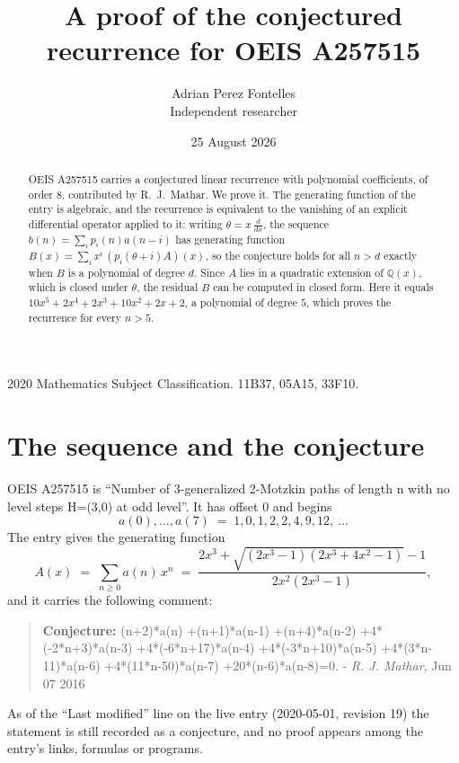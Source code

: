 \documentclass[11pt,a4paper]{article}
\title{A proof of the conjectured recurrence for OEIS A257515}
\author{Adrian Perez Fontelles\\ \small Independent researcher}
\date{25 August 2026}
\theoremstyle{plain}
\theoremstyle{definition}
\begin{document}
\maketitle

\begin{abstract}
OEIS A257515 carries a conjectured linear recurrence with polynomial coefficients, of
order 8, contributed by R.~J.~Mathar. We prove it. The generating function of the
entry is algebraic, and the recurrence is equivalent to the vanishing of an explicit
differential operator applied to it: writing $\theta=x\,\frac{d}{dx}$, the sequence
$b(n)=\sum_{i}p_{i}(n)a(n-i)$ has generating function
$B(x)=\sum_{i}x^{i}\,(p_{i}(\theta+i)A)(x)$, so the conjecture holds for all $n>d$ exactly
when $B$ is a polynomial of degree $d$. Since $A$ lies in a quadratic extension of
$\mathbb{Q}(x)$, which is closed under $\theta$, the residual $B$ can be computed in
closed form. Here it equals $10 x^{5} + 2 x^{4} + 2 x^{3} + 10 x^{2} + 2 x + 2$, a polynomial of degree $5$, which proves
the recurrence for every $n>5$.
\end{abstract}

\noindent\small 2020 Mathematics Subject Classification. 11B37, 05A15, 33F10.\normalsize

\section{The sequence and the conjecture}

OEIS A257515 is ``Number of 3-generalized 2-Motzkin paths of length n with no level steps H=(3,0) at odd level''. It has offset $0$ and begins
\[
a(0),\dots,a(7)\;=\;1, 0, 1, 2, 2, 4, 9, 12,\ \dots
\]
The entry gives the generating function
\begin{equation}\label{eq:gf}
A(x)\;=\;\sum_{n\ge 0} a(n)\,x^{n}\;=\;\frac{2 x^{3} + \sqrt{\left(2 x^{3} - 1\right) \left(2 x^{3} + 4 x^{2} - 1\right)} - 1}{2 x^{2} \left(2 x^{3} - 1\right)} ,
\end{equation}
and it carries the following comment:
\begin{quote}\small
\textbf{Conjecture:} (n+2)*a(n) +(n+1)*a(n-1) +(n+4)*a(n-2) +4*(-2*n+3)*a(n-3) +4*(-6*n+17)*a(n-4) +4*(-3*n+10)*a(n-5) +4*(3*n-11)*a(n-6) +4*(11*n-50)*a(n-7) +20*(n-6)*a(n-8)=0. - \emph{R. J. Mathar}, Jun 07 2016
\end{quote}
As of the ``Last modified'' line on the live entry (2020-05-01, revision 19) the
statement is still recorded as a conjecture, and no proof appears among the entry's links,
formulas or programs.
\end{document}
